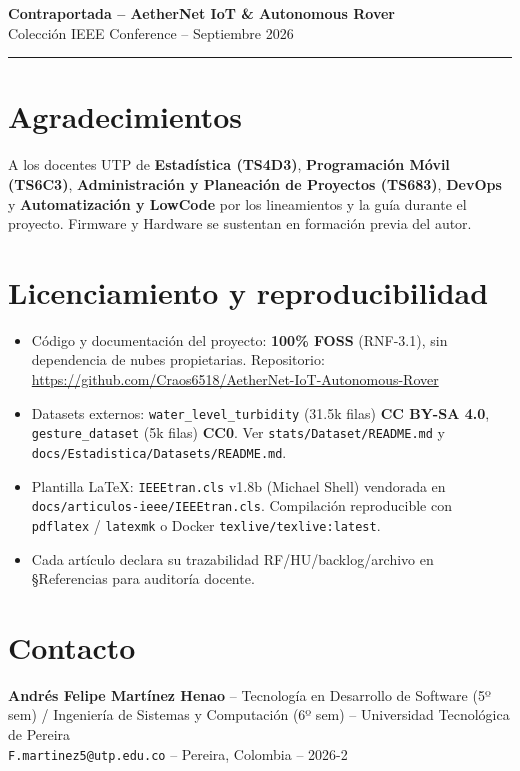 \documentclass[a4paper,12pt]{article}
\begin{document}
\thispagestyle{empty}
\begin{center}
{\large \textbf{Contraportada -- AetherNet IoT \& Autonomous Rover}}\\[4mm]
{\small Colección IEEE Conference -- Septiembre 2026}\\
\hrule\vspace{8mm}
\end{center}

\section*{Agradecimientos}
A los docentes UTP de \textbf{Estadística (TS4D3)}, \textbf{Programación Móvil (TS6C3)}, \textbf{Administración y Planeación de Proyectos (TS683)}, \textbf{DevOps} y \textbf{Automatización y LowCode} por los lineamientos y la guía durante el proyecto. Firmware y Hardware se sustentan en formación previa del autor.

\section*{Licenciamiento y reproducibilidad}
\begin{itemize}
\item Código y documentación del proyecto: \textbf{100\% FOSS} (RNF-3.1), sin dependencia de nubes propietarias. Repositorio: \url{https://github.com/Craos6518/AetherNet-IoT-Autonomous-Rover}
\item Datasets externos: \texttt{water\_level\_turbidity} (31.5k filas) \textbf{CC BY-SA 4.0}, \texttt{gesture\_dataset} (5k filas) \textbf{CC0}. Ver \texttt{stats/Dataset/README.md} y \texttt{docs/Estadistica/Datasets/README.md}.
\item Plantilla LaTeX: \texttt{IEEEtran.cls} v1.8b (Michael Shell) vendorada en \texttt{docs/articulos-ieee/IEEEtran.cls}. Compilación reproducible con \texttt{pdflatex} / \texttt{latexmk} o Docker \texttt{texlive/texlive:latest}.
\item Cada artículo declara su trazabilidad RF/HU/backlog/archivo en \S Referencias para auditoría docente.
\end{itemize}

\section*{Contacto}
\textbf{Andrés Felipe Martínez Henao} -- Tecnología en Desarrollo de Software (5º sem) / Ingeniería de Sistemas y Computación (6º sem) -- Universidad Tecnológica de Pereira\\
\texttt{F.martinez5@utp.edu.co} -- Pereira, Colombia -- 2026-2
\end{document}
